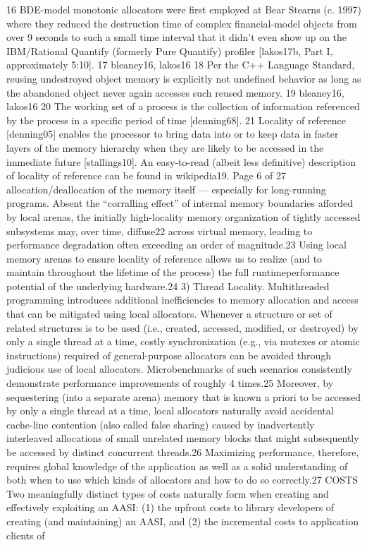 16 BDE-model monotonic allocators were first employed at Bear Stearns (c. 1997) where they reduced
the destruction time of complex financial-model objects from over 9 seconds to such a small time
interval that it didn’t even show up on the IBM/Rational Quantify (formerly Pure Quantify) profiler
[lakos17b, Part I, approximately 5:10]. 17 bleaney16, lakos16
18 Per the C++ Language Standard, reusing undestroyed object memory is explicitly not undefined
behavior as long as the abandoned object never again accesses such reused memory.
19 bleaney16, lakos16
20 The working set of a process is the collection of information referenced by the process in a specific
period of time [denning68].
21 Locality of reference [denning05] enables the processor to bring data into or to keep data in faster
layers of the memory hierarchy when they are likely to be accessed in the immediate future
[stallings10]. An easy-to-read (albeit less definitive) description of locality of reference can be found
in wikipedia19.
Page 6 of 27
allocation/deallocation of the memory itself — especially for long-running
programs. Absent the “corralling effect” of internal memory boundaries
afforded by local arenas, the initially high-locality memory organization of
tightly accessed subsystems may, over time, diffuse22 across virtual memory,
leading to performance degradation often exceeding an order of magnitude.23
Using local memory arenas to ensure locality of reference allows us to realize
(and to maintain throughout the lifetime of the process) the full runtimeperformance potential of the underlying hardware.24
3) Thread Locality. Multithreaded programming introduces additional
inefficiencies to memory allocation and access that can be mitigated using
local allocators. Whenever a structure or set of related structures is to be used
(i.e., created, accessed, modified, or destroyed) by only a single thread at a
time, costly synchronization (e.g., via mutexes or atomic instructions) required
of general-purpose allocators can be avoided through judicious use of local
allocators. Microbenchmarks of such scenarios consistently demonstrate
performance improvements of roughly 4 times.25 Moreover, by sequestering
(into a separate arena) memory that is known a priori to be accessed by only a
single thread at a time, local allocators naturally avoid accidental cache-line
contention (also called false sharing) caused by inadvertently interleaved
allocations of small unrelated memory blocks that might subsequently be
accessed by distinct concurrent threads.26
Maximizing performance, therefore, requires global knowledge of the application as
well as a solid understanding of both when to use which kinds of allocators and how
to do so correctly.27
COSTS
Two meaningfully distinct types of costs naturally form when creating and effectively
exploiting an AASI: (1) the upfront costs to library developers of creating (and
maintaining) an AASI, and (2) the incremental costs to application clients of


